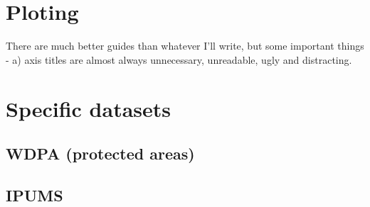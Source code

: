 \section{Ploting}
There are much better guides than whatever I'll write, but some important things - 
a) axis titles are almost always unnecessary, unreadable, ugly and distracting. 

\section{Specific datasets}

\subsection{WDPA (protected areas)}

\subsection{IPUMS}




